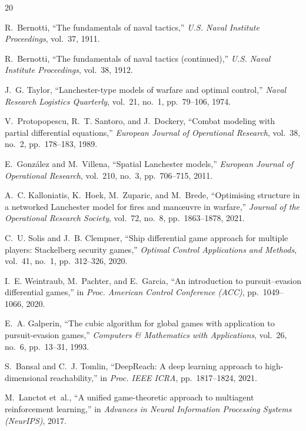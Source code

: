 \documentclass[12pt,a4paper]{article}
\begin{document}

\begin{thebibliography}{20}

R.~Bernotti, ``The fundamentals of naval tactics,'' \emph{U.S. Naval
Institute Proceedings}, vol.~37, 1911.

R.~Bernotti, ``The fundamentals of naval tactics (continued),'' \emph{U.S.
Naval Institute Proceedings}, vol.~38, 1912.

J.~G. Taylor, ``Lanchester-type models of warfare and optimal control,''
\emph{Naval Research Logistics Quarterly}, vol.~21, no.~1, pp.~79--106,
1974.

V.~Protopopescu, R.~T. Santoro, and J.~Dockery, ``Combat modeling with
partial differential equations,'' \emph{European Journal of Operational
Research}, vol.~38, no.~2, pp.~178--183, 1989.

E.~Gonz{\'a}lez and M.~Villena, ``Spatial Lanchester models,'' \emph{European
Journal of Operational Research}, vol.~210, no.~3, pp.~706--715, 2011.

A.~C. Kalloniatis, K.~Hoek, M.~Zuparic, and M.~Brede, ``Optimising
structure in a networked Lanchester model for fires and man{\oe}uvre in
warfare,'' \emph{Journal of the Operational Research Society}, vol.~72,
no.~8, pp.~1863--1878, 2021.

C.~U. Solis and J.~B. Clempner, ``Ship differential game approach for
multiple players: Stackelberg security games,'' \emph{Optimal Control
Applications and Methods}, vol.~41, no.~1, pp.~312--326, 2020.

I.~E. Weintraub, M.~Pachter, and E.~Garcia, ``An introduction to
pursuit--evasion differential games,'' in \emph{Proc. American Control
Conference (ACC)}, pp.~1049--1066, 2020.

E.~A. Galperin, ``The cubic algorithm for global games with application to
pursuit-evasion games,'' \emph{Computers \& Mathematics with
Applications}, vol.~26, no.~6, pp.~13--31, 1993.

S.~Bansal and C.~J. Tomlin, ``DeepReach: A deep learning approach to
high-dimensional reachability,'' in \emph{Proc. IEEE ICRA}, pp.~1817--1824,
2021.

M.~Lanctot et~al., ``A unified game-theoretic approach to multiagent
reinforcement learning,'' in \emph{Advances in Neural Information
Processing Systems (NeurIPS)}, 2017.


\end{thebibliography}
\end{document}
